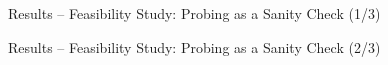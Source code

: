 \documentclass[aspectratio=169]{beamer}
\begin{document}
\begin{frame}{Results -- Feasibility Study: Probing as a Sanity Check (1/3)}
    \begin{figure}[!ht]
        \centering
    \end{figure}
\end{frame}

\begin{frame}{Results -- Feasibility Study: Probing as a Sanity Check (2/3)}
    \begin{figure}[!ht]
        \centering
    \end{figure}
\end{frame}
\end{document}
